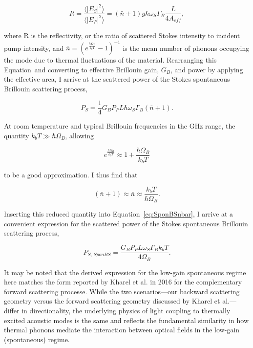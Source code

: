 \begin{equation}
  R = \frac{\langle|E_{S}|^{2}\rangle}{\langle|E_{P}|^{2}\rangle} = (\bar{n} + 1)g\hbar\omega_{S}\Gamma_{B}\frac{L}{4A_{eff}},
\end{equation}

where R is the reflectivity, or the ratio of scattered Stokes intensity to incident pump intensity, and $\bar{n} = (e^{\frac{\hbar\Omega_{B}}{k_{b}T}} - 1)^{-1}$ is the mean number of phonons occupying the mode due to thermal fluctuations of the material. Rearranging this Equation~and converting to effective Brillouin gain, $G_{B}$, and power by applying the effective area, I arrive at the scattered power of the Stokes spontaneous Brillouin scattering process,

\begin{equation}
  P_S = \frac{1}{4}G_{B}P_{P}L\hbar\omega_{S}\Gamma_{B}(\bar{n} + 1).
  \label{eq:SponBSnbar}
\end{equation}

At room temperature and typical Brillouin frequencies in the GHz range, the quantity $k_{b}T \gg \hbar\Omega_{B}$, allowing

\begin{equation}
e^{\frac{\hbar\Omega_{B}}{k_{b}T}} \approx 1 + \frac{\hbar\Omega_{B}}{k_{b}T}
\end{equation}

to be a good approximation. I thus find that

\begin{equation}
(\bar{n} + 1) \approx \bar{n} \approx \frac{k_{b}T}{\hbar\Omega_{B}}.
\end{equation}

Inserting this reduced quantity into Equation~\ref{eq:SponBSnbar}, I arrive at a convenient expression for the scattered power of the Stokes spontaneous Brillouin scattering process,

\begin{equation}
  P_{S, \,\textit{SponBS}} = \frac{G_{B}P_{P}L\omega_{S}\Gamma_{B}k_{b}T}{4\Omega_{B}}.
\end{equation}

It may be noted that the derived expression for the low-gain spontaneous regime here matches the form reported by Kharel et al. in 2016 \cite{kharel2016noise} for the complementary forward scattering processe. While the two scenarios—our backward scattering geometry versus the forward scattering geometry discussed by Kharel et al.—differ in directionality, the underlying physics of light coupling to thermally excited acoustic modes is the same and reflects the fundamental similarity in how thermal phonons mediate the interaction between optical fields in the low-gain (spontaneous) regime.

